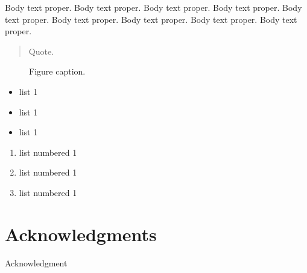 Body text proper.  Body text proper.  Body text proper.  Body text proper.
Body text proper.  Body text proper.  Body text proper.  Body text proper.
Body text proper.  

\begin{quote}
Quote. 
\end{quote}
 
\begin{figure}[h]
\begin{center}
\end{center}
\caption{Figure caption.}
\end{figure}

\begin{itemize}
\item	list 1
\item	list 1
\item	list 1
\end{itemize}

\begin{enumerate}
\item	list numbered 1
\item	list numbered 1
\item	list numbered 1
\end{enumerate}

\appendix 

\section{Acknowledgments}
Acknowledgment





